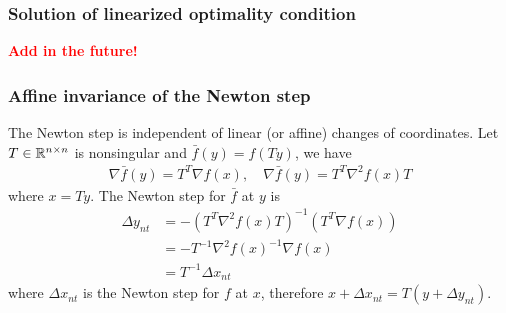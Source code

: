 \subsubsection{Solution of linearized optimality condition}
\textcolor{red}{\textbf{Add in the future!}}

\subsubsection{Affine invariance of the Newton step}
The Newton step is independent of linear (or affine) changes of coordinates.
Let $T\in\mathbb{R}^{n\times n}$ is nonsingular and $\bar{f}(y)=f(Ty)$, we have
\begin{align*}
  \nabla\bar{f}(y)=T^T\nabla f(x),\quad\nabla\bar{f}(y)=T^T\nabla^2f(x)T
\end{align*}
where $x=Ty$. The Newton step for $\bar{f}$ at $y$ is
\begin{align*}
  \Delta y_{nt} &= -(T^T\nabla^2f(x)T)^{-1}(T^T\nabla f(x))\\
                &= -T^{-1}\nabla^2f(x)^{-1}\nabla f(x)\\
                &= T^{-1}\Delta x_{nt}
\end{align*}
where $\Delta x_{nt}$ is the Newton step for $f$ at $x$, therefore $x+\Delta x_{nt}=T(y+\Delta y_{nt})$.

